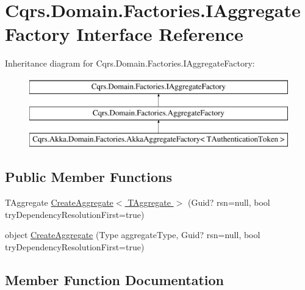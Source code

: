 \hypertarget{interfaceCqrs_1_1Domain_1_1Factories_1_1IAggregateFactory}{}\section{Cqrs.\+Domain.\+Factories.\+I\+Aggregate\+Factory Interface Reference}
\label{interfaceCqrs_1_1Domain_1_1Factories_1_1IAggregateFactory}
Inheritance diagram for Cqrs.\+Domain.\+Factories.\+I\+Aggregate\+Factory\+:\begin{figure}[H]
\begin{center}
\leavevmode
\includegraphics[height=3.000000cm]{interfaceCqrs_1_1Domain_1_1Factories_1_1IAggregateFactory}
\end{center}
\end{figure}
\subsection*{Public Member Functions}
\begin{DoxyCompactItemize}
\item 
T\+Aggregate \hyperlink{interfaceCqrs_1_1Domain_1_1Factories_1_1IAggregateFactory_aa9723aadb2dfeae42287520d76f3a397_aa9723aadb2dfeae42287520d76f3a397}{Create\+Aggregate$<$ T\+Aggregate $>$} (Guid? rsn=null, bool try\+Dependency\+Resolution\+First=true)
\item 
object \hyperlink{interfaceCqrs_1_1Domain_1_1Factories_1_1IAggregateFactory_a0013390ede7737375e7dbcffcadf3a12_a0013390ede7737375e7dbcffcadf3a12}{Create\+Aggregate} (Type aggregate\+Type, Guid? rsn=null, bool try\+Dependency\+Resolution\+First=true)
\end{DoxyCompactItemize}


\subsection{Member Function Documentation}
\mbox{\label{interfaceCqrs_1_1Domain_1_1Factories_1_1IAggregateFactory_a0013390ede7737375e7dbcffcadf3a12_a0013390ede7737375e7dbcffcadf3a12}} 
